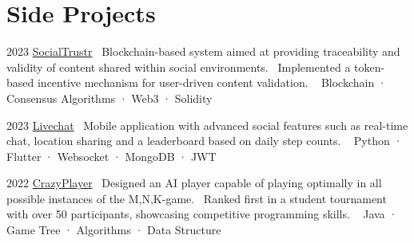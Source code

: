 \documentclass{tccv}
\begin{document}
\section{Side Projects}

\begin{yearlist}

\item{2023}
     {\href{https://github.com/manuelarto/socialtrustr}{SocialTrustr}}
     {\textbullet~Blockchain-based system aimed at providing traceability and validity of content shared within social environments. \newline
     \textbullet~Implemented a token-based incentive mechanism for user-driven content validation. \newline
     \textbullet~ Blockchain · Consensus Algorithms · Web3 · Solidity}
\item{2023}
     {\href{https://github.com/manuelarto/livechat}{Livechat}}
     {\textbullet~Mobile application with advanced social features such as real-time chat, location sharing and a leaderboard based on daily step counts. \newline
    \textbullet~ Python · Flutter · Websocket · MongoDB · JWT}
\item{2022}
     {\href{https://github.com/manuelarto/crazyplayer}{CrazyPlayer}}
     {\textbullet~Designed an AI player capable of playing optimally in all possible instances of the M,N,K-game. \newline
     \textbullet~Ranked first in a student tournament with over 50 participants, showcasing competitive programming skills. \newline
    \textbullet~ Java · Game Tree · Algorithms · Data Structure}

\end{yearlist}





\end{document}
